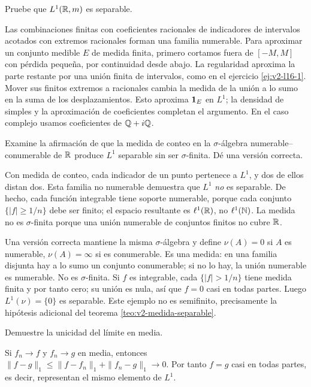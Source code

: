 \begin{ejercicio}\label{ej:v2-l16-5}
Pruebe que $L^1(\mathbb R,m)$ es separable.
\end{ejercicio}
\begin{solucion}
Las combinaciones finitas con coeficientes racionales de indicadores de intervalos acotados con extremos racionales forman una familia numerable. Para aproximar un conjunto medible $E$ de medida finita, primero cortamos fuera de $[-M,M]$ con pérdida pequeña, por continuidad desde abajo. La regularidad aproxima la parte restante por una unión finita de intervalos, como en el ejercicio \ref{ej:v2-l16-1}. Mover sus finitos extremos a racionales cambia la medida de la unión a lo sumo en la suma de los desplazamientos. Esto aproxima $\mathbf1_{E}$ en $L^1$; la densidad de simples y la aproximación de coeficientes completan el argumento. En el caso complejo usamos coeficientes de $\mathbb Q+i\mathbb Q$.
\end{solucion}

\begin{ejercicio}\label{ej:v2-l16-6}
Examine la afirmación de que la medida de conteo en la $\sigma$-álgebra numerable--conumerable de $\mathbb R$ produce $L^1$ separable sin ser $\sigma$-finita. Dé una versión correcta.
\end{ejercicio}
\begin{solucion}
Con medida de conteo, cada indicador de un punto pertenece a $L^1$, y dos de ellos distan dos. Esta familia no numerable demuestra que $L^1$ \emph{no} es separable. De hecho, cada función integrable tiene soporte numerable, porque cada conjunto $\{|f|\ge1/n\}$ debe ser finito; el espacio resultante es $\ell^1(\mathbb R)$, no $\ell^1(\mathbb N)$. La medida no es $\sigma$-finita porque una unión numerable de conjuntos finitos no cubre $\mathbb R$.

Una versión correcta mantiene la misma $\sigma$-álgebra y define $\nu(A)=0$ si $A$ es numerable, $\nu(A)=\infty$ si es conumerable. Es una medida: en una familia disjunta hay a lo sumo un conjunto conumerable; si no lo hay, la unión numerable es numerable. No es $\sigma$-finita. Si $f$ es integrable, cada $\{|f|>1/n\}$ tiene medida finita y por tanto cero; su unión es nula, así que $f=0$ casi en todas partes. Luego $L^1(\nu)=\{0\}$ es separable. Este ejemplo no es semifinito, precisamente la hipótesis adicional del teorema \ref{teo:v2-medida-separable}.
\end{solucion}

\begin{ejercicio}\label{ej:v2-l17-1}
Demuestre la unicidad del límite en media.
\end{ejercicio}
\begin{solucion}
Si $f_n\to f$ y $f_n\to g$ en media, entonces $\|f-g\|_1\le\|f-f_n\|_1+\|f_n-g\|_1\to0$. Por tanto $f=g$ casi en todas partes, es decir, representan el mismo elemento de $L^1$.
\end{solucion}

